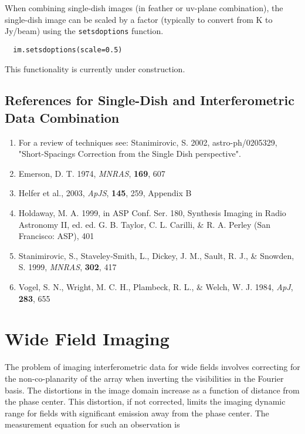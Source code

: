When combining single-dish images (in feather or uv-plane
combination), the single-dish image can be scaled by a factor
(typically to convert from K to Jy/beam) using the {\tt setsdoptions}
function.

\small
\begin{verbatim}
  im.setsdoptions(scale=0.5)
\end{verbatim}
\normalsize

\vspace{3mm}

This functionality is currently under construction.

\subsection{References for Single-Dish and Interferometric Data Combination}
\label{section:imtool.SDcombo.refs}

\begin{enumerate}
   \item For a review of techniques see: Stanimirovic, S. 2002,
         astro-ph/0205329, "Short-Spacings Correction from the Single
         Dish perspective".
   \item Emerson, D. T. 1974, {\it MNRAS}, {\bf 169}, 607
   \item Helfer et al., 2003, {\it ApJS}, {\bf 145}, 259, Appendix B
   \item Holdaway, M. A. 1999, in ASP Conf. Ser. 180, Synthesis
         Imaging in Radio Astronomy II, ed. ed. G. B. Taylor,
         C. L. Carilli, \& R. A. Perley (San Francisco: ASP), 401
   \item Stanimirovic, S., Staveley-Smith, L., Dickey, J. M., Sault,
         R. J., \& Snowden, S. 1999, {\it MNRAS}, {\bf 302}, 417 
   \item Vogel, S. N., Wright, M. C. H., Plambeck, R. L., \& Welch,
         W. J. 1984, {\it ApJ}, {\bf 283}, 655 
\end{enumerate}

\section{Wide Field Imaging}
\label{section:imtool.widefield}

The problem of imaging interferometric data for wide fields involves
correcting for the non-co-planarity of the array when inverting the
visibilities in the Fourier basis.  The distortions in the image
domain increase as a function of distance from the phase center.  This
distortion, if not corrected, limits the imaging dynamic range for
fields with significant emission away from the phase center.  The
measurement equation for such an observation is

